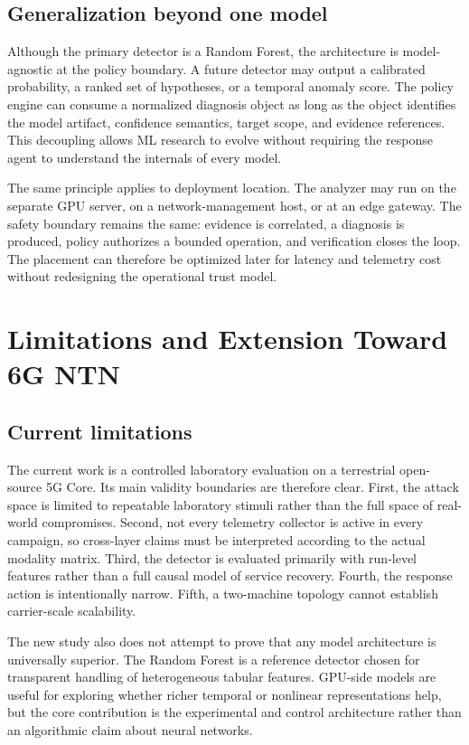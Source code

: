 \documentclass[sigconf,review]{acmart}
\begin{document}
\subsection{Generalization beyond one model}
Although the primary detector is a Random Forest, the architecture is model-agnostic at the policy boundary. A future detector may output a calibrated probability, a ranked set of hypotheses, or a temporal anomaly score. The policy engine can consume a normalized diagnosis object as long as the object identifies the model artifact, confidence semantics, target scope, and evidence references. This decoupling allows ML research to evolve without requiring the response agent to understand the internals of every model.

The same principle applies to deployment location. The analyzer may run on the separate GPU server, on a network-management host, or at an edge gateway. The safety boundary remains the same: evidence is correlated, a diagnosis is produced, policy authorizes a bounded operation, and verification closes the loop. The placement can therefore be optimized later for latency and telemetry cost without redesigning the operational trust model.

\section{Limitations and Extension Toward 6G NTN}
\subsection{Current limitations}
The current work is a controlled laboratory evaluation on a terrestrial open-source 5G Core. Its main validity boundaries are therefore clear. First, the attack space is limited to repeatable laboratory stimuli rather than the full space of real-world compromises. Second, not every telemetry collector is active in every campaign, so cross-layer claims must be interpreted according to the actual modality matrix. Third, the detector is evaluated primarily with run-level features rather than a full causal model of service recovery. Fourth, the response action is intentionally narrow. Fifth, a two-machine topology cannot establish carrier-scale scalability.

The new study also does not attempt to prove that any model architecture is universally superior. The Random Forest is a reference detector chosen for transparent handling of heterogeneous tabular features. GPU-side models are useful for exploring whether richer temporal or nonlinear representations help, but the core contribution is the experimental and control architecture rather than an algorithmic claim about neural networks.
\end{document}
